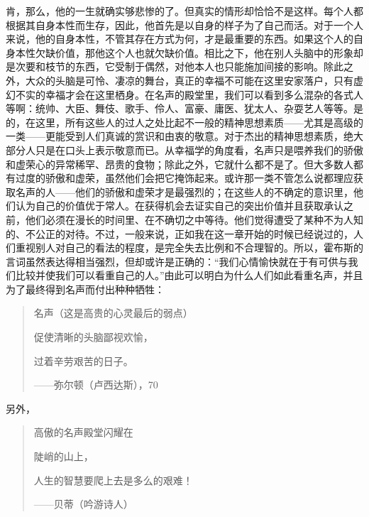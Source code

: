 \documentclass[12pt,oneside]{book}
\begin{document}
肯，那么，他的一生就确实够悲惨的了。但真实的情形却恰恰不是这样。每个人都根据其自身本性而生存，因此，他首先是以自身的样子为了自己而活。对于一个人来说，他的自身本性，不管其存在方式为何，才是最重要的东西。如果这个人的自身本性欠缺价值，那他这个人也就欠缺价值。相比之下，他在别人头脑中的形象却是次要和枝节的东西，它受制于偶然，对他本人也只能施加间接的影响。除此之外，大众的头脑是可怜、凄凉的舞台，真正的幸福不可能在这里安家落户，只有虚幻不实的幸福才会在这里栖身。在名声的殿堂里，我们可以看到多么混杂的各式人等啊：统帅、大臣、舞伎、歌手、伶人、富豪、庸医、犹太人、杂耍艺人等等。是的，在这里，所有这些人的过人之处比起不一般的精神思想素质——尤其是高级的一类——更能受到人们真诚的赏识和由衷的敬意。对于杰出的精神思想素质，绝大部分人只是在口头上表示敬意而已。从幸福学的角度看，名声只是喂养我们的骄傲和虚荣心的异常稀罕、昂贵的食物；除此之外，它就什么都不是了。但大多数人都有过度的骄傲和虚荣，虽然他们会把它掩饰起来。或许那一类不管怎么说都理应获取名声的人——他们的骄傲和虚荣才是最强烈的；在这些人的不确定的意识里，他们认为自己的价值优于常人。在获得机会去证实自己的突出价值并且获取承认之前，他们必须在漫长的时间里、在不确切之中等待。他们觉得遭受了某种不为人知的、不公正的对待。不过，一般来说，正如我在这一章开始的时候已经说过的，人们重视别人对自己的看法的程度，是完全失去比例和不合理智的。所以，霍布斯的言词虽然表达得相当强烈，但却或许是正确的：“我们心情愉快就在于有可供与我们比较并使我们可以看重自己的人。”由此可以明白为什么人们如此看重名声，并且为了最终得到名声而付出种种牺牲： 


\begin{quotation}
名声（这是高贵的心灵最后的弱点） 

促使清晰的头脑鄙视欢愉， 

过着辛劳艰苦的日子。 

——弥尔顿（卢西达斯），70 
\end{quotation}
 

另外， 

 
\begin{quotation}
高傲的名声殿堂闪耀在 

陡峭的山上，

人生的智慧要爬上去是多么的艰难！ 

——贝蒂（吟游诗人） 
\end{quotation}
 
\end{document}
